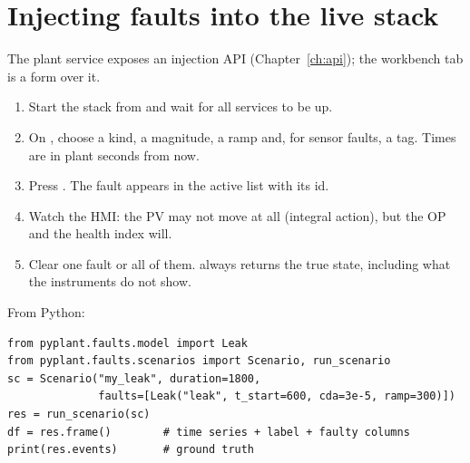 \section{Injecting faults into the live stack}

The plant service exposes an injection API (Chapter~\ref{ch:api}); the
workbench  tab is a form over it.

\begin{enumerate}
  \item Start the stack from  and wait for all services to be up.
  \item On , choose a kind, a magnitude, a ramp and, for sensor
        faults, a tag. Times are in plant seconds from now.
  \item Press . The fault appears in the active list with its id.
  \item Watch the HMI: the PV may not move at all (integral action), but the
        OP and the health index will.
  \item Clear one fault or all of them.  always returns
        the true state, including what the instruments do not show.
\end{enumerate}

From Python:
\begin{lstlisting}
from pyplant.faults.model import Leak
from pyplant.faults.scenarios import Scenario, run_scenario
sc = Scenario("my_leak", duration=1800,
              faults=[Leak("leak", t_start=600, cda=3e-5, ramp=300)])
res = run_scenario(sc)
df = res.frame()        # time series + label + faulty columns
print(res.events)       # ground truth
\end{lstlisting}
